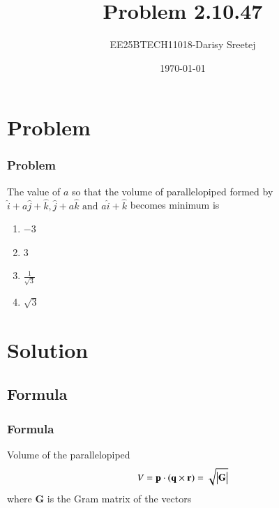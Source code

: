 \documentclass{beamer}
\title{Problem 2.10.47}
\author{EE25BTECH11018-Darisy Sreetej}
\date{\today}
\theoremstyle{remark}
\let\vec\mathbf
\numberwithin{equation}{section}
\begin{document}
\begin{frame}
\titlepage
\end{frame}


\section{Problem}

\begin{frame}
\frametitle{Problem}
The value of $a$ so that the volume of parallelopiped formed by $\hat{i} + a\hat{j} + \hat{k}, \hat{j} + a\hat{k} \text{ and } a\hat{i} + \hat{k}$ becomes minimum is
\begin{enumerate}
\item $-3$
\item $3$
\item $\frac{1}{\sqrt{3}}$
\item $\sqrt{3}$
\end{enumerate}
\end{frame}
\section{Solution}

\subsection{Formula}
\setcounter{section}{1}
\begin{frame}
\frametitle{Formula}
Volume of the parallelopiped
\begin{align*}
 V=\vec{p} \cdot (\vec{q} \times \vec{r}) = \sqrt{\mydet{\vec{G}}}  
\end{align*}
where $\vec{G}$ is the Gram matrix of the vectors
\end{frame}
\end{document}
